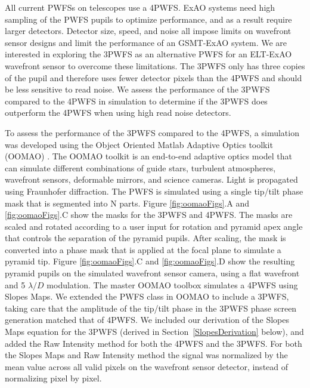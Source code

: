 All current PWFSs on telescopes use a 4PWFS. ExAO systems need high sampling of the PWFS pupils to optimize performance, and as a result require larger detectors. Detector size, speed, and noise all impose limits on wavefront sensor designs and limit the performance of an GSMT-ExAO system. We are interested in exploring the 3PWFS as an alternative PWFS for an ELT-ExAO wavefront sensor to overcome these limitations. The 3PWFS only has three copies of the pupil and therefore uses fewer detector pixels than the 4PWFS and should be less sensitive to read noise. We assess the performance of the 3PWFS compared to the 4PWFS in simulation to determine if the 3PWFS does outperform the 4PWFS when using high read noise detectors.

To assess the performance of the 3PWFS compared to the 4PWFS, a simulation was developed using the Object Oriented Matlab Adaptive Optics toolkit (OOMAO) \cite{OOMAO}. The OOMAO toolkit is an end-to-end adaptive optics model that can simulate different combinations of guide stars, turbulent atmospheres, wavefront sensors, deformable mirrors, and science cameras. Light is propagated using Fraunhofer diffraction. The PWFS is simulated using a single tip/tilt phase mask that is segmented into N parts. Figure \ref{fig:oomaoFigs}.A and \ref{fig:oomaoFigs}.C show the masks for the 3PWFS and 4PWFS. The masks are scaled and rotated according to a user input for rotation and pyramid apex angle that controls the separation of the pyramid pupils. After scaling, the mask is converted into a phase mask that is applied at the focal plane to simulate a pyramid tip. Figure \ref{fig:oomaoFigs}.C and \ref{fig:oomaoFigs}.D show the resulting pyramid pupils on the simulated wavefront sensor camera, using a flat wavefront and 5 $\lambda/D$ modulation. The master OOMAO toolbox simulates a 4PWFS using Slopes Maps. We extended the PWFS class in OOMAO to include a 3PWFS, taking care that the amplitude of the tip/tilt phase in the 3PWFS phase screen generation matched that of 4PWFS. We included our derivation of the Slopes Maps equation for the 3PWFS (derived in Section~\ref{SlopesDerivation} below), and added the Raw Intensity method for both the 4PWFS and the 3PWFS. For both the Slopes Maps and Raw Intensity method the signal was normalized by the mean value across all valid pixels on the wavefront sensor detector, instead of normalizing pixel by pixel. 

